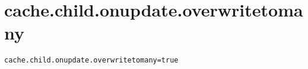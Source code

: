 \section{cache.child.onupdate.overwritetomany}
\label{configuration:CacheChildOnupdateOverwritetomany}
\ClearAPI
\TODO
{}
\begin{lstlisting}[style=Props,caption={Usage example for \textit{cache.child.onupdate.overwritetomany}}]
cache.child.onupdate.overwritetomany=true
\end{lstlisting}